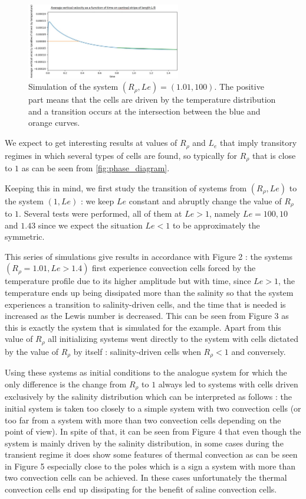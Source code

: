 \documentclass{article}
\begin{document}
\begin{figure}[ht]
  \centering
  \includegraphics[width=0.6\textwidth]{images/last_subsection/fig3.png}
  \caption{Simulation of the system $(R_{\rho},Le) = (1.01,100)$. The positive part means that the cells are driven by the temperature distribution and a transition occurs at the intersection between the blue and orange curves.}
  \label{fig:flux_analysis}
\end{figure}
\par
We expect to get interesting results at values of $R_{\rho}$ and $L_e$ that imply transitory regimes in which several types of cells are found, so typically for $R_{\rho}$ that is close to $1$ as can be seen from \cref{fig:phase_diagram}.
\par
Keeping this in mind, we first study the transition of systems from $(R_{\rho},Le)$ to the system $(1,Le)$ : we keep $Le$ constant and abruptly change the value of $R_{\rho}$ to $1$. Several tests were performed, all of them at $Le > 1$, namely $Le = 100, 10$ and $1.43$ since we expect the situation $Le < 1$ to be approximately the symmetric.
\par
This series of simulations give results in accordance with Figure 2 : the systems $(R_{\rho} = 1.01, Le > 1.4)$ first experience convection cells forced by the temperature profile due to its higher amplitude but with time, since $Le > 1$, the temperature ends up being dissipated more than the salinity so that the system experiences a transition to salinity-driven cells, and the time that is needed is increased as the Lewis number is decreased. This can be seen from Figure 3 as this is exactly the system that is simulated for the example. Apart from this value of $R_{\rho}$ all initializing systems went directly to the system with cells dictated by the value of $R_{\rho}$ by itself : salinity-driven cells when $R_{\rho} < 1$ and conversely.
\par
Using these systems as initial conditions to the analogue system for which the only difference is the change from $R_{\rho}$ to $1$ always led to systems with cells driven exclusively by the salinity distribution which can be interpreted as follows : the initial system is taken too closely to a simple system with two convection cells (or too far from a system with more than two convection cells depending on the point of view). In spite of that, it can be seen from Figure 4 that even though the system is mainly driven by the salinity distribution, in some cases during the transient regime it does show some features of thermal convection as can be seen in Figure 5 especially close to the poles which is a sign a system with more than two convection cells can be achieved. In these cases unfortunately the thermal convection cells end up dissipating for the benefit of saline convection cells.
\end{document}
